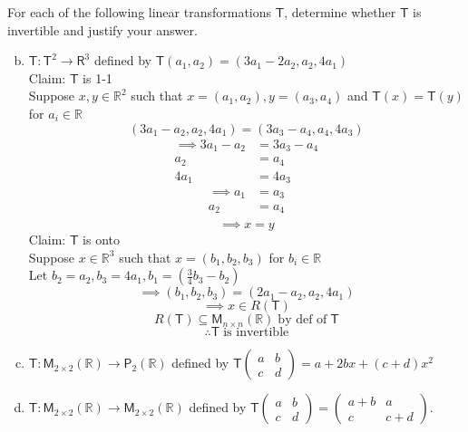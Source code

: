 For each of the following linear transformations $\mathsf{T}$,
determine whether $\mathsf{T}$ is invertible and justify your answer.
\begin{enumerate}[(a)]
\setcounter{enumii}{1}
\item $\mathsf{T}\colon \mathsf{T}^2 \to \mathsf{R}^3$ defined by
  $\mathsf{T}(a_1,a_2) = (3a_1-2a_2,a_2,4a_1)$
\\Claim: $\mathsf{T}$ is 1-1
\\Suppose $x,y\in \mathbb{R}^2$ such that $x=(a_1,a_2), y= (a_3,a_4)$
and $\mathsf{T}(x)=\mathsf{T}(y)$ for $a_i \in \mathbb{R}$
\begin{equation}
(3a_1-a_2,a_2,4a_1) = (3a_3-a_4,a_4,4a_3)
\end{equation}
\begin{align}
\implies 3a_1-a_2 &= 3a_3-a_4\\
a_2&= a_4\\
4a_1&= 4a_3
\end{align}
\begin{align}
\implies a_1&=a_3\\
a_2&=a_4\\
\end{align}
\begin{equation}
\implies x=y
\end{equation}
Claim: $\mathsf{T}$ is onto
\\Suppose $x\in\mathbb{R}^3$ such that $x=(b_1,b_2,b_3)$ for $b_i\in
\mathbb{R}$
\\Let $b_2=a_2,b_3=4a_1,b_1=(\frac{3}{4}b_3-b_2)$
\begin{equation}
\implies (b_1,b_2,b_3) = (2a_1-a_2,a_2,4a_1)
\end{equation}
\begin{equation}
\implies x\in R(\mathsf{T})
\end{equation}
\begin{equation}
R(\mathsf{T}) \subseteq \mathsf{M}_{n\times n}(\mathbb{R})\;\text{by
  def of}\; \mathsf{T}
\end{equation}
\begin{equation}
\therefore \mathsf{T}\;\text{is invertible}
\end{equation}
\setcounter{enumii}{4}
\item $\mathsf{T}\colon \mathsf{M}_{2\times 2}(\mathbb{R}) \to \mathsf{P}_2(\mathbb{R})$ defined by $\mathsf{T}\begin{pmatrix}a&b\\c&d
  \end{pmatrix} = a + 2bx + (c+d)x^2$
\item $\mathsf{T}\colon \mathsf{M}_{2\times 2}(\mathbb{R}) \to
  \mathsf{M}_{2\times 2}(\mathbb{R})$ defined by $\mathsf{T}\begin{pmatrix}a&b\\c&d
  \end{pmatrix} = \begin{pmatrix} a+b& a\\ c & c+d
  \end{pmatrix}$.
\end{enumerate}
